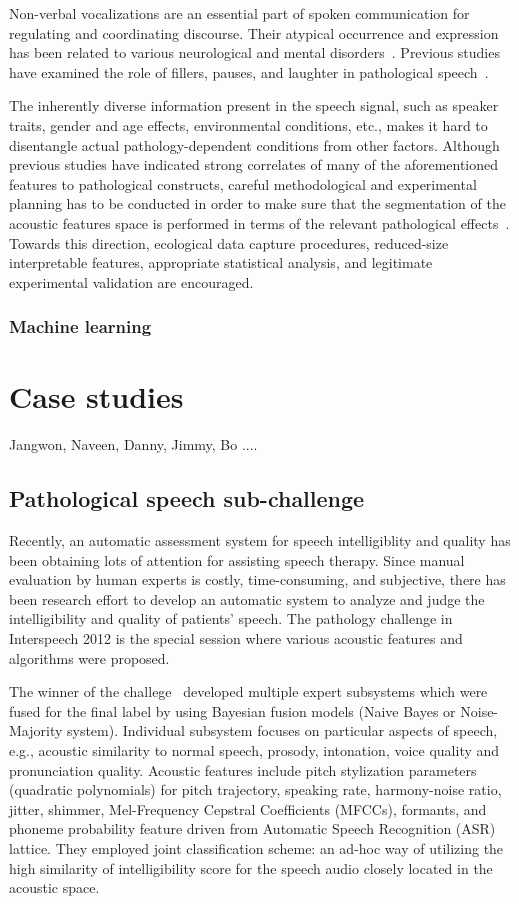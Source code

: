 \documentclass{article}
\begin{document}
Non-verbal vocalizations are an essential part of spoken communication for regulating and coordinating discourse. Their atypical occurrence and expression has been related to various neurological and mental disorders~\cite{lake2011listener}. Previous studies have examined the role of fillers, pauses, and laughter in pathological speech~\cite{heeman2010autism,lake2011listener,gupta2014predicting}.

The inherently diverse information present in the speech signal, such as speaker traits, gender and age effects, environmental conditions, etc., makes it hard to disentangle actual pathology-dependent conditions from other factors. Although previous studies have indicated strong correlates of many of the aforementioned features to pathological constructs, careful methodological and experimental planning has to be conducted in order to make sure that the segmentation of the acoustic features space is performed in terms of the relevant pathological effects~\cite{bone2013classifying}. Towards this direction, ecological data capture procedures, reduced-size interpretable features, appropriate statistical analysis, and legitimate experimental validation are encouraged.

\subsubsection{Machine learning}


\section{Case studies}
Jangwon, Naveen, Danny, Jimmy, Bo ....

\subsection{Pathological speech sub-challenge}
Recently, an automatic assessment system for speech intelligiblity and quality has been obtaining lots of attention for assisting speech therapy.
Since manual evaluation by human experts is costly, time-consuming, and subjective, there has been research effort to develop an automatic system to analyze and judge the intelligibility and quality of patients' speech.
The pathology challenge in Interspeech 2012 is the special session where various acoustic features and algorithms were proposed.

The winner of the challege~\cite{kim2012intelligibility} developed multiple expert subsystems which were fused for the final label by using Bayesian fusion models (Naive Bayes or Noise-Majority system).
Individual subsystem focuses on particular aspects of speech, e.g., acoustic similarity to normal speech, prosody, intonation, voice quality and pronunciation quality.
Acoustic features include pitch stylization parameters (quadratic polynomials) for pitch trajectory, speaking rate, harmony-noise ratio, jitter, shimmer, Mel-Frequency Cepstral Coefficients (MFCCs), formants, and phoneme probability feature driven from Automatic Speech Recognition (ASR) lattice.
They employed joint classification scheme: an ad-hoc way of utilizing the high similarity of intelligibility score for the speech audio closely located in the acoustic space.
\end{document}
